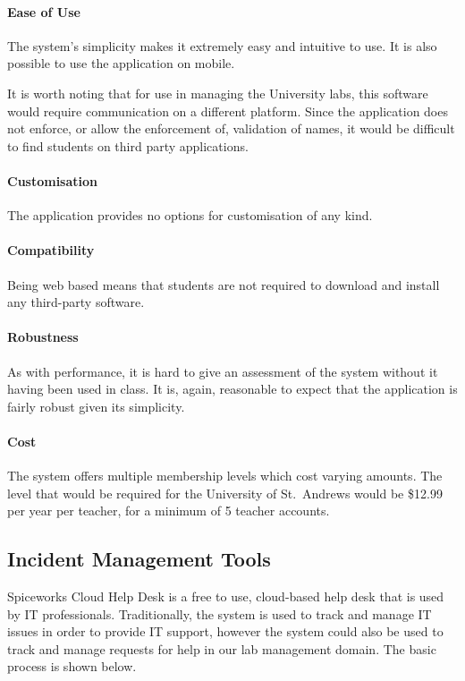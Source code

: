 \documentclass[a4paper,11pt]{article}
\begin{document}
\paragraph{Ease of Use}
The system's simplicity makes it extremely easy and intuitive to use. It is also possible to use the application on mobile. 

It is worth noting that for use in managing the University labs, this software would require communication on a different platform. Since the application does not enforce, or allow the enforcement of, validation of names, it would be difficult to find students on third party applications.


\paragraph{Customisation} 
The application provides no options for customisation of any kind.


\paragraph{Compatibility}  
Being web based means that students are not required to download and install any third-party software. 


\paragraph{Robustness}
As with performance, it is hard to give an assessment of the system without it having been used in class. It is, again, reasonable to expect that the application is fairly robust given its simplicity.


\paragraph{Cost}  
The system offers multiple membership levels which cost varying amounts. The level that would be required for the University of St.\ Andrews would be \$12.99 per year per teacher, for a minimum of 5 teacher accounts.


\newpage
\subsection{Incident Management Tools}

Spiceworks Cloud Help Desk is a free to use, cloud-based help desk that is used by IT professionals. Traditionally, the system is used to track and manage IT issues in order to provide IT support, however the system could also be used to track and manage requests for help in our lab management domain. The basic process is shown below.
\end{document}

